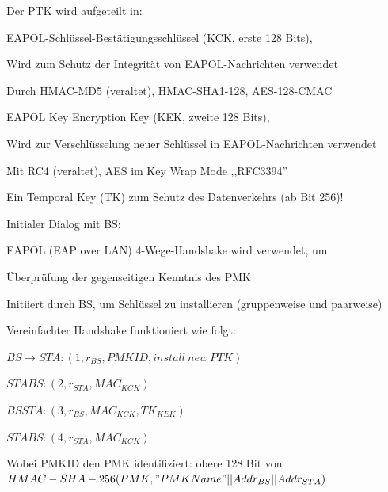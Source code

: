 \documentclass[a4paper]{article}
\begin{document}
\begin{multicols}{3}
\begin{itemize*}
            \item Der PTK wird aufgeteilt in:
            \begin{itemize*}
                  \item EAPOL-Schlüssel-Bestätigungsschlüssel (KCK, erste 128 Bits),
                  \begin{itemize*}
                        \item Wird zum Schutz der Integrität von EAPOL-Nachrichten verwendet
                        \item Durch HMAC-MD5 (veraltet), HMAC-SHA1-128, AES-128-CMAC
                  \end{itemize*}
                  \item EAPOL Key Encryption Key (KEK, zweite 128 Bits),
                  \begin{itemize*}
                        \item Wird zur Verschlüsselung neuer Schlüssel in EAPOL-Nachrichten verwendet
                        \item Mit RC4 (veraltet), AES im Key Wrap Mode ,,RFC3394''
                  \end{itemize*}
                  \item Ein Temporal Key (TK) zum Schutz des Datenverkehrs (ab Bit 256)!
            \end{itemize*}
            \item Initialer Dialog mit BS:
            \begin{itemize*}
                  \item EAPOL (EAP over LAN) 4-Wege-Handshake wird verwendet, um
                  \begin{itemize*}
                        \item Überprüfung der gegenseitigen Kenntnis des PMK
                        \item Initiiert durch BS, um Schlüssel zu installieren (gruppenweise und paarweise)
                  \end{itemize*}
                  \item Vereinfachter Handshake funktioniert wie folgt:
                  \begin{enumerate*}
                        \item $BS\rightarrow STA: (1, r_{BS} , PMKID, install\ new\ PTK)$
                        \item $STA BS: (2, r_{STA}, MAC_{KCK})$
                        \item $BS STA: (3, r_{BS}, MAC_{KCK}, {TK}_{KEK})$
                        \item $STA BS: (4, r_{STA}, MAC_{KCK})$
                  \end{enumerate*}
                  \item Wobei PMKID den PMK identifiziert: obere 128 Bit von $HMAC-SHA-256(PMK, "PMK Name" || Addr_{BS} || Addr_{STA} )$
            \end{itemize*}
      \end{itemize*}



\end{multicols}
\end{document}
